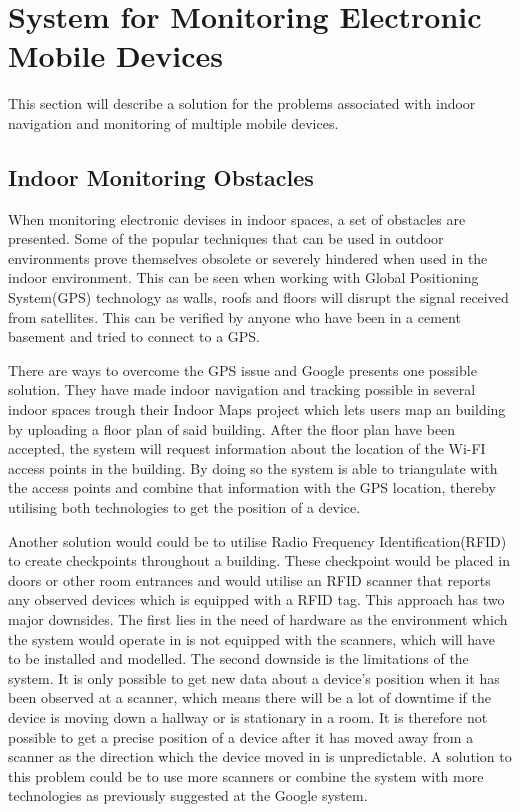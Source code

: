 \section{System for Monitoring Electronic Mobile Devices}\label{sec:monitoring}
This section will describe a solution for the problems associated with indoor navigation and monitoring of multiple mobile devices.    

\subsection{Indoor Monitoring Obstacles}
When monitoring electronic devises in indoor spaces, a set of obstacles are presented. Some of the popular techniques that can be used in outdoor environments prove themselves obsolete or severely hindered when used in the indoor environment. This can be seen when working with Global Positioning System(GPS) technology as walls, roofs and floors will disrupt the signal received from satellites. This can be verified by anyone who have been in a cement basement and tried to connect to a GPS.

There are ways to overcome the GPS issue and Google presents one possible solution. They have made indoor navigation and tracking possible in several indoor spaces trough their Indoor Maps project which lets users map an building by uploading a floor plan of said building. After the floor plan have been accepted, the system will request information about the location of the Wi-FI access points in the building. By doing so the system is able to triangulate with the access points and combine that information with the GPS location, thereby utilising both technologies to get the position of a device.

Another solution would could be to utilise Radio Frequency Identification(RFID) to create checkpoints throughout a building. These checkpoint would be placed in doors or other room entrances and would utilise an RFID scanner that reports any observed devices which is equipped with a RFID tag\cite{indoor_bin}. %
This approach has two major downsides. The first lies in the need of hardware as the environment which the system would operate in is not equipped with the scanners, which will have to be installed and modelled. The second downside is the limitations of the system. It is only possible to get new data about a device's position when it has been observed at a scanner, which means there will be a lot of downtime if the device is moving down a hallway or is stationary in a room. It is therefore not possible to get a precise position of a device after it has moved away from a scanner as the direction which the device moved in is unpredictable. A solution to this problem could be to use more scanners or combine the system with more technologies as previously suggested at the Google system.

